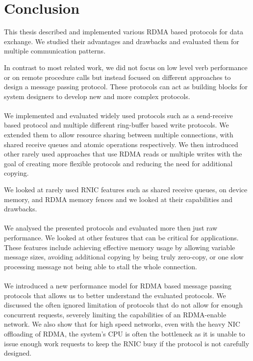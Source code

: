 \section{Conclusion}

This thesis described and implemented various RDMA based protocols for data exchange. We studied their advantages and 
drawbacks and evaluated them for multiple communication patterns.

In contrast to most related work, we did not focus on low level verb performance or on remote procedure calls but instead 
focused on different approaches to design a message passing protocol. These protocols can act as building blocks for 
system designers to develop new and more complex protocols.

\paragraph{} We implemented and evaluated widely used protocols such as a send-receive based protocol and multiple different
ring-buffer based write protocols. We extended them to allow resource sharing between multiple connections, with shared 
receive queues and atomic operations respectively. We then introduced other rarely used approaches that use RDMA reads or 
multiple writes with the goal of creating more flexible protocols and reducing the need for additional copying.

We looked at rarely used RNIC features such as shared receive queues, on device memory, and RDMA memory fences and we looked
at their capabilities and drawbacks.


\paragraph{} We analysed the presented protocols and evaluated more then just raw performance. We looked at other
features that can be critical for applications.  These features include achieving effective memory usage by allowing 
variable message sizes, avoiding additional copying by being truly zero-copy, or one slow processing message not
being able to stall the whole connection.

\paragraph{} We introduced a new performance model for RDMA based message passing protocols that allows us to 
better understand the evaluated protocols. We discussed the often ignored limitation of protocols that do not allow for enough
concurrent requests, severely limiting the capabilities of an RDMA-enable network. We also show that for high speed networks,
even with the heavy NIC offloading of RDMA, the system's CPU is often the bottleneck as it is unable to issue enough work requests to
keep the RNIC busy if the protocol is not carefully designed.


